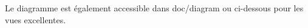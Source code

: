 \documentclass[french, 12pt]{article}
\begin{document}
Le diagramme est également accessible dans doc/diagram ou ci-dessous pour les vues excellentes.



\end{document}
